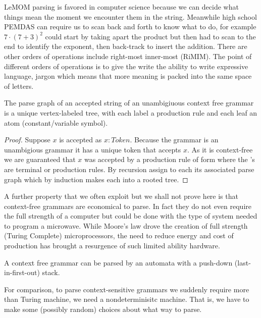 LeMOM parsing is favored in computer science because we can 
decide what things mean the moment we encounter them in the string.
Meanwhile high school PEMDAS can require us to scan back and forth 
to know what to do, for example $7\cdot (7+3)^2$ could start by taking 
apart the product but then had to scan to the end to identify the exponent,
then back-track to insert the addition.  
There are other orders of operations include right-most inner-most (RiMIM).
The point of different orders of operations is to give the write the ability 
to write expressive language, jargon which means that more meaning is packed 
into the same space of letters.




\begin{proposition}
    The parse graph of an accepted string of an unambigiuous context free grammar 
    is a unique vertex-labeled tree, with each label a production rule and each leaf 
    an atom (constant/variable symbol).
\end{proposition}
\begin{proof}
    Suppose $x$ is accepted as $x:Token$.  
    Because the grammar is an unambigious grammar 
    it has a unique token that accepts $x$.
    As it is context-free we are guaranteed 
    that $x$ was accepted by a production rule of form 
     where the 
    's are 
    terminal or production rules.  By recursion assign 
    to each  its associated parse graph which
     by induction makes each into a rooted tree.
\end{proof}

A further property that we often exploit but we shall not prove here is that 
context-free grammars are economical to parse.  In fact they do not even 
require the full strength of a computer but could be done with the type 
of system needed to program a microwave.  While Moore's law drove the creation 
of full strength (Turing Complete) microprocessors, the need to reduce energy 
and cost of production has brought a resurgence of such limited ability 
hardware.  
\begin{proposition}
    A context free grammar can be parsed by an automata with a push-down (last-in-first-out)
    stack.
\end{proposition}

For comparison, to parse context-sensitive grammars we suddenly require more 
than Turing machine, we need a nondeterminisitc machine.  That is, we have to make 
some (possibly random) choices about what way to parse.

